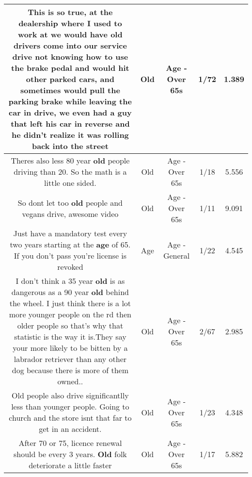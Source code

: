 \documentclass[11pt]{article}
\newlength\mylength
\begin{document}
\begin{center}
\begin{longtable}{|C{.65\mylength}|C{.30\mylength}|C{.12\mylength}|C{.12\mylength}|C{.12\mylength}|}
  \small This is so true, at the dealership where I used to work at we would have \textbf{old} drivers come into our service drive not knowing how to use the brake pedal and would hit other parked cars, and sometimes would pull the parking brake while leaving the car in drive, we even had a guy that left his car in reverse and he didn't realize it was rolling back into the street\normalsize   & Old & Age - Over 65s & 1/72 & 1.389 \\  \hline
  \small Theres also less 80 year \textbf{old} people driving than 20. So the math is a little one sided.\normalsize   & Old & Age - Over 65s & 1/18 & 5.556 \\  \hline
  \small So dont let too \textbf{old} people and vegans drive, awesome video\normalsize   & Old & Age - Over 65s & 1/11 & 9.091 \\  \hline
  \small Just have a mandatory test every two years starting at the \textbf{age} of 65. If you don't pass you're license is revoked\normalsize   & Age & Age - General & 1/22 & 4.545 \\  \hline
  \small I don't think a 35 year \textbf{old} is as dangerous as a 90 year \textbf{old} behind the wheel. I just think there is a lot more younger people on the rd then older people so that's why that statistic is the way it is.They say your more likely to be bitten by a labrador retriever than any other dog because there is more of them owned..\normalsize   & Old & Age - Over 65s & 2/67 & 2.985 \\  \hline
  \small Old people also drive significantlly less than younger people. Going to church and the store isnt that far to get in an accident.\normalsize   & Old & Age - Over 65s & 1/23 & 4.348 \\  \hline
  \small After 70 or 75, licence renewal should be every 3 years. \textbf{Old} folk deteriorate a little faster\normalsize   & Old & Age - Over 65s & 1/17 & 5.882 \\  \hline

\end{longtable}
\end{center}
\end{document}
